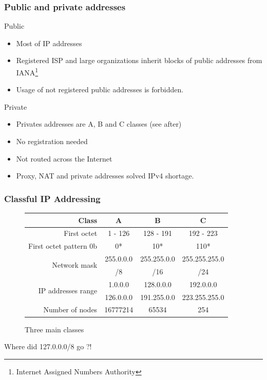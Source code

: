  \begin{frame}
    \frametitle{Public and private addresses}
    \begin{block}{Public}
      \begin{itemize}
        \item Most of IP addresses \pause
        \item Registered ISP and large organizations inherit blocks of public addresses from IANA\footnote{Internet Assigned Numbers Authority} \pause
        \item Usage of not registered public addresses is forbidden.
      \end{itemize}
    \end{block}
    \begin{block}{Private}
      \begin{itemize}
        \item Privates addresses are A, B and C classes (see after)\pause
        \item No registration needed \pause
        \item Not routed across the Internet \pause
        \item Proxy, NAT and private addresses solved IPv4 shortage.
      \end{itemize}
    \end{block}
  \end{frame}

  
  \begin{frame}
    \frametitle{Classful IP Addressing}
    \begin{figure}
      \centering
      \begin{tabular}{|r||c|c|c|}
        \hline
        Class & A & B & C \\ \hline \hline
        First octet & 1 - 126 & 128 - 191 & 192 - 223 \\ \hline
        First octet pattern 0b& 0* & 10* & 110* \\ \hline
        \multirow{2}{*}{\color{brown}Network mask} & 255.0.0.0 & 255.255.0.0 & 255.255.255.0\\
         & /8 & /16 & /24 \\ \hline
        \multirow{2}{*}{IP addresses range} & 1.0.0.0 & 128.0.0.0 & 192.0.0.0\\
        & 126.0.0.0 & 191.255.0.0 & 223.255.255.0 \\ \hline
        Number of nodes & 16777214 & 65534 & 254 \\ \hline
      \end{tabular}
      \caption{Three main classes}
    \end{figure}
    Where did 127.0.0.0/8 go ?!
  \end{frame}

